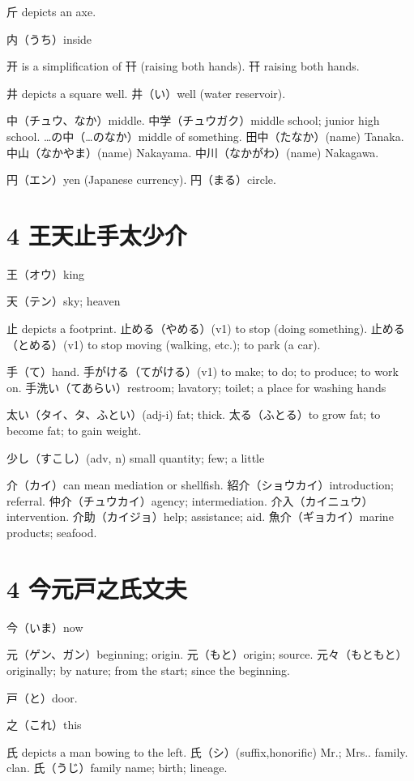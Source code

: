 斤 depicts an axe.

内（うち）inside

开 is a simplification of 幵 (raising both hands).
幵 raising both hands.

井 depicts a square well.
井（い）well (water reservoir).

中（チュウ、なか）middle.
中学（チュウガク）middle school; junior high school.
…の中（…のなか）middle of something.
田中（たなか）(name) Tanaka.
中山（なかやま）(name) Nakayama.
中川（なかがわ）(name) Nakagawa.

円（エン）yen (Japanese currency).
円（まる）circle.

\section{4 王天止手太少介}

王（オウ）king

天（テン）sky; heaven

止 depicts a footprint.
止める（やめる）(v1) to stop (doing something).
止める（とめる）(v1) to stop moving (walking, etc.); to park (a car).

手（て）hand.
手がける（てがける）(v1) to make; to do; to produce; to work on.
手洗い（てあらい）restroom; lavatory; toilet; a place for washing hands

太い（タイ、タ、ふとい）(adj-i) fat; thick.
太る（ふとる）to grow fat; to become fat; to gain weight.

少し（すこし）(adv, n) small quantity; few; a little

介（カイ）can mean mediation or shellfish.
紹介（ショウカイ）introduction; referral.
仲介（チュウカイ）agency; intermediation.
介入（カイニュウ）intervention.
介助（カイジョ）help; assistance; aid.
魚介（ギョカイ）marine products; seafood.

\section{4 今元戸之氏文夫}

今（いま）now

元（ゲン、ガン）beginning; origin.
元（もと）origin; source.
元々（もともと）
originally; by nature; from the start; since the beginning.

戸（と）door.

之（これ）this

氏 depicts a man bowing to the left.
氏（シ）(suffix,honorific) Mr.; Mrs.. family. clan.
氏（うじ）family name; birth; lineage.

